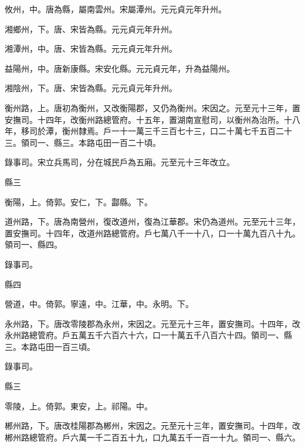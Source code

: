 \begin{pinyinscope}
 攸州，中。唐為縣，屬南雲州。宋屬潭州。元元貞元年升州。



 湘鄉州，下。唐、宋皆為縣。元元貞元年升州。



 湘潭州，中。唐、宋皆為縣。元元貞元年升州。



 益陽州，中。唐新康縣。宋安化縣。元元貞元年，升為益陽州。



 湘陰州，下。唐、宋皆為縣。元元貞元年升州。



 衡州路，上。唐初為衡州，又改衡陽郡，又仍為衡州。宋因之。元至元十三年，置安撫司。十四年，改衡州路總管府。十五年，置湖南宣慰司，以衡州為治所。十八年，移司於潭，衡州隸焉。戶一十一萬三千三百七十三，口二十萬七千五百二十三。領司一、縣三。本路屯田一百二十頃。



 錄事司。宋立兵馬司，分在城民戶為五廂。元至元十三年改立。



 縣三



 衡陽，上。倚郭。安仁，下。酃縣。下。



 道州路，下。唐為南營州，復改道州，復為江華郡。宋仍為道州。元至元十三年，置安撫司。十四年，改道州路總管府。戶七萬八千一十八，口一十萬九百八十九。領司一、縣四。



 錄事司。



 縣四



 營道，中。倚郭。寧遠，中。江華，中。永明。下。



 永州路，下。唐改零陵郡為永州，宋因之。元至元十三年，置安撫司。十四年，改永州路總管府。戶五萬五千六百六十六，口一十萬五千八百六十四。領司一、縣三。本路屯田一百三頃。



 錄事司。



 縣三



 零陵，上。倚郭。東安，上。祁陽。中。



 郴州路，下。唐改桂陽郡為郴州，宋因之。元至元十三年，置安撫司。十四年，改郴州路總管府。戶六萬一千二百五十九，口九萬五千一百一十九。領司一、縣六。




\end{pinyinscope}
